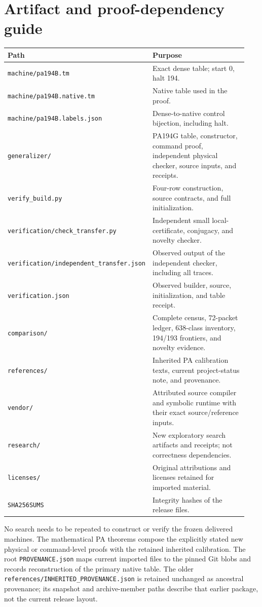 \documentclass[11pt]{article}
\newcommand{\file}[1]{\nolinkurl{#1}}
\begin{document}
\section{Artifact and proof-dependency guide}
\begin{longtable}{@{}p{0.38\linewidth}p{0.56\linewidth}@{}}
\toprule
Path & Purpose\\\midrule\endhead
\file{machine/pa194B.tm} & Exact dense table; start 0, halt 194.\\
\file{machine/pa194B.native.tm} & Native table used in the proof.\\
\file{machine/pa194B.labels.json} & Dense-to-native control bijection, including halt.\\
\file{generalizer/} & PA194G table, constructor, command proof, independent physical checker, source inputs, and receipts.\\
\file{verify_build.py} & Four-row construction, source contracts, and full initialization.\\
\file{verification/check_transfer.py} & Independent small local-certificate, conjugacy, and novelty checker.\\
\file{verification/independent_transfer.json} & Observed output of the independent checker, including all traces.\\
\file{verification.json} & Observed builder, source, initialization, and table receipt.\\
\file{comparison/} & Complete census, 72-packet ledger, 638-class inventory, 194/193 frontiers, and novelty evidence.\\
\file{references/} & Inherited PA calibration texts, current project-status note, and provenance.\\
\file{vendor/} & Attributed source compiler and symbolic runtime with their exact source/reference inputs.\\
\file{research/} & New exploratory search artifacts and receipts; not correctness dependencies.\\
\file{licenses/} & Original attributions and licenses retained for imported material.\\
\file{SHA256SUMS} & Integrity hashes of the release files.\\
\bottomrule
\end{longtable}
No search needs to be repeated to construct or verify the frozen delivered
machines. The mathematical PA theorems compose the explicitly stated new
physical or command-level proofs with the retained inherited calibration.
The root \file{PROVENANCE.json} maps current imported files to the pinned
Git blobs and records reconstruction of the primary native table. The
older \file{references/INHERITED_PROVENANCE.json} is retained unchanged as
ancestral provenance; its snapshot and archive-member paths describe that
earlier package, not the current release layout.
\end{document}
